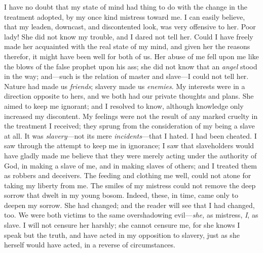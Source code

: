 I have no doubt that my state of mind had {}thing to do with the change
in the treatment adopted, by my once kind mistress toward me. I can
easily believe, that my leaden, downcast, and discontented look, was
very offensive to her. Poor lady! She did not know my trouble, and I
dared not tell her. Could I have freely made her acquainted with the
real state of my mind, and given her the reasons therefor, it might have
been well for both of us. Her abuse of me fell upon me like the blows of
the false prophet upon his ass; she did not know that an \emph{angel}
stood in the way; and---such is the relation of master and slave---I
could not tell her. Nature had made us \emph{friends}; slavery made us
\emph{enemies}. My interests were in a direction opposite to hers, and
we both had our private thoughts and plans. She aimed to keep me
ignorant; and I resolved to know, although knowledge only increased my
discontent. My feelings were not the result of any marked cruelty in the
treatment I received; they sprung from the consideration of my being a
slave at all. It was \emph{slavery}---not its mere
\emph{incidents}---that I hated. I had been cheated. I saw through the
attempt to keep me in ignorance; I saw that slaveholders would have
gladly made me believe that they were merely acting under the authority
of God, in making a slave of me, and in making slaves of others; and I
treated them as robbers and deceivers. The feeding and clothing me well,
could not atone for taking my liberty from me. The smiles of my mistress
could not remove the deep sorrow that dwelt in my young bosom. Indeed,
these, in time, came only to deepen my sorrow. She had changed; and the
reader will see that I had changed, too. We {}were both victims to the
same overshadowing evil---\emph{she,} as mistress, \emph{I}, as slave. I
will not censure her harshly; she cannot censure me, for she knows I
speak but the truth, and have acted in my opposition to slavery, just as
she herself would have acted, in a reverse of circumstances.
